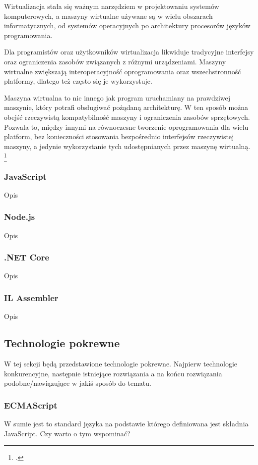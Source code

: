 \documentclass[a4paper]{article}
\begin{document}
\par Wirtualizacja stała się ważnym narzędziem w projektowaniu systemów komputerowych, a maszyny wirtualne używane są w wielu obszarach informatycznych, od systemów operacyjnych po architektury procesorów języków programowania.
\par Dla programistów oraz użytkowników wirtualizacja likwiduje tradycyjne interfejsy oraz ograniczenia zasobów związanych z różnymi urządzeniami. Maszyny wirtualne zwiększają interoperacyjność oprogramowania oraz wszechstronność platformy, dlatego też często się je wykorzystuje.
\par Maszyna wirtualna to nic innego jak program uruchamiany na prawdziwej maszynie, który potrafi obsługiwać pożądaną architekturę. W ten sposób można obejść rzeczywistą kompatybilność maszyny i ograniczenia zasobów sprzętowych. Pozwala to, między innymi na równoczesne tworzenie oprogramowania dla wielu platform, bez konieczności stosowania bezpośrednio interfejsów rzeczywistej maszyny, a jedynie wykorzystanie tych udostępnianych przez maszynę wirtualną. \footcite{Smith2005}

\subsubsection{JavaScript}
Opis
%

\subsubsection{Node.js}
Opis
\subsubsection{.NET Core}
Opis
\subsubsection{IL Assembler}
Opis

\subsection{Technologie pokrewne}
W tej sekcji będą przedstawione technologie pokrewne.
Najpierw technologie konkurencyjne, następnie istniejące rozwiązania a na końcu rozwiązania podobne/nawiązujące w jakiś sposób do tematu.

\subsubsection{ECMAScript}
W sumie jest to standard języka na podstawie którego definiowana jest składnia JavaScript. Czy warto o tym wspominać?
\end{document}
